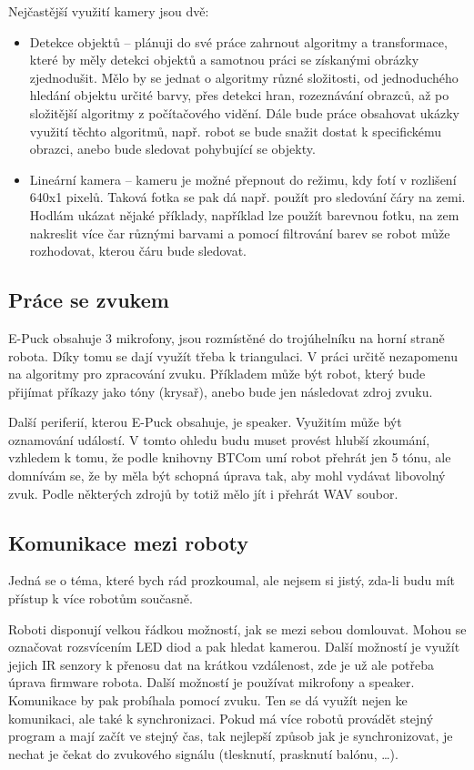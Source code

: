 \documentclass[11pt]{article}
\begin{document}
Nejčastější využití kamery jsou dvě:
\begin{itemize}
\item Detekce objektů -- plánuji do své práce zahrnout algoritmy a
transformace, které by měly detekci objektů a samotnou práci se získanými
obrázky zjednodušit. Mělo by se jednat o algoritmy různé složitosti, od
jednoduchého hledání objektu určité barvy, přes detekci hran, rozeznávání
obrazců, až po složitější algoritmy z počítačového vidění. Dále bude práce
obsahovat ukázky využití těchto algoritmů, např. robot se bude snažit dostat k
specifickému obrazci, anebo bude sledovat pohybující se objekty.

\item Lineární kamera -- kameru je možné přepnout do režimu, kdy fotí v
rozlišení 640x1 pixelů. Taková fotka se pak dá např. použít pro sledování čáry
na zemi. Hodlám ukázat nějaké příklady, například lze použít barevnou fotku, na
zem nakreslit více čar různými barvami a pomocí filtrování barev se robot může
rozhodovat, kterou čáru bude sledovat.
\end{itemize}

\subsection{Práce se zvukem}
E-Puck obsahuje 3 mikrofony, jsou rozmístěné do trojúhelníku na horní straně
robota. Díky tomu se dají využít třeba k triangulaci. V práci určitě nezapomenu
na algoritmy pro zpracování zvuku. Příkladem může být robot, který bude
přijímat příkazy jako tóny (krysař), anebo bude jen následovat zdroj zvuku.

Další periferií, kterou E-Puck obsahuje, je speaker. Využitím může být
oznamování událostí. V tomto ohledu budu muset provést hlubší zkoumání,
vzhledem k tomu, že podle knihovny BTCom umí robot přehrát jen 5 tónu, ale
domnívám se, že by měla být schopná úprava tak, aby mohl vydávat libovolný
zvuk. Podle některých zdrojů by totiž mělo jít i přehrát WAV soubor.

\subsection{Komunikace mezi roboty}
Jedná se o téma, které bych rád prozkoumal, ale nejsem si jistý, zda-li budu
mít přístup k více robotům současně.

Roboti disponují velkou řádkou možností, jak se mezi sebou domlouvat. Mohou se
označovat rozsvícením LED diod a pak hledat kamerou. Další možností je využít
jejich IR senzory k přenosu dat na krátkou vzdálenost, zde je už ale potřeba
úprava firmware robota. Další možností je používat mikrofony a speaker.
Komunikace by pak probíhala pomocí zvuku. Ten se dá využít nejen ke komunikaci,
ale také k synchronizaci. Pokud má více robotů provádět stejný program a mají
začít ve stejný čas, tak nejlepší způsob jak je synchronizovat, je nechat je
čekat do zvukového signálu (tlesknutí, prasknutí balónu, \ldots). 
\end{document}
